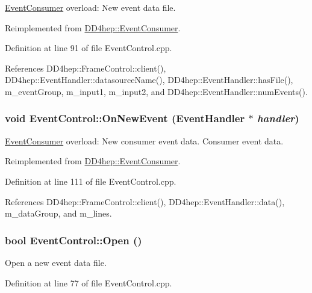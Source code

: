\hyperlink{class_d_d4hep_1_1_event_consumer}{EventConsumer} overload: New event data file. 

Reimplemented from \hyperlink{class_d_d4hep_1_1_event_consumer_a0a1c56dd7a70e28812fb68c9144ef2fa}{DD4hep::EventConsumer}.

Definition at line 91 of file EventControl.cpp.

References DD4hep::FrameControl::client(), DD4hep::EventHandler::datasourceName(), DD4hep::EventHandler::hasFile(), m\_\-eventGroup, m\_\-input1, m\_\-input2, and DD4hep::EventHandler::numEvents().\hypertarget{class_d_d4hep_1_1_event_control_af3644b3a91372e313440eaca8cf893c2}{
\subsubsection[{OnNewEvent}]{\setlength{\rightskip}{0pt plus 5cm}void EventControl::OnNewEvent ({\bf EventHandler} $\ast$ {\em handler})}}
\label{class_d_d4hep_1_1_event_control_af3644b3a91372e313440eaca8cf893c2}


\hyperlink{class_d_d4hep_1_1_event_consumer}{EventConsumer} overload: New consumer event data. Consumer event data. 

Reimplemented from \hyperlink{class_d_d4hep_1_1_event_consumer_a755b12d11f8676c4f2957f6a1f26fb31}{DD4hep::EventConsumer}.

Definition at line 111 of file EventControl.cpp.

References DD4hep::FrameControl::client(), DD4hep::EventHandler::data(), m\_\-dataGroup, and m\_\-lines.\hypertarget{class_d_d4hep_1_1_event_control_ac317c6010a8ee404fb90da3081a05d8d}{
\subsubsection[{Open}]{\setlength{\rightskip}{0pt plus 5cm}bool EventControl::Open ()}}
\label{class_d_d4hep_1_1_event_control_ac317c6010a8ee404fb90da3081a05d8d}


Open a new event data file. 

Definition at line 77 of file EventControl.cpp.

